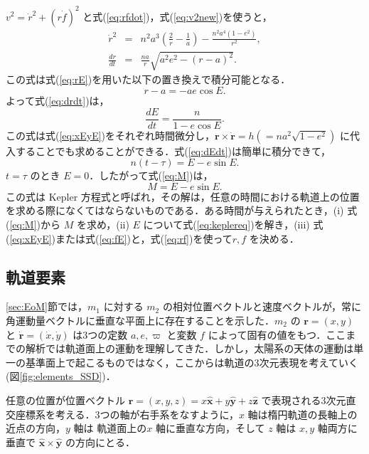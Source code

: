 \documentclass[11pt,a4paper,oneside,onecolumn]{jreport}
\begin{document}
$v^2 = \dot{r}^2 + (r \dot{f})^2$ と式(\ref{eq:rfdot})，式(\ref{eq:v2new})を使うと，
\begin{eqnarray}
\dot{r}^2 & = & n^2 a^3 \left( \frac{2}{r} - \frac{1}{a} \right) - \frac{n^2 a^4 (1 - e^2)}{r^2}, \\
\frac{dr}{dt} & = & \frac{na}{r} \sqrt{a^2 e^2 - (r - a)^2}. \label{eq:drdt}
\end{eqnarray}
この式は式(\ref{eq:rE})を用いた以下の置き換えで積分可能となる．
\begin{equation}
r - a = - a e \cos E.
\end{equation}
よって式(\ref{eq:drdt})は，
\begin{equation}
\frac{dE}{dt} = \frac{n}{1 - e \cos E}. \label{eq:dEdt}
\end{equation}
この式は式(\ref{eq:xEyE})をそれぞれ時間微分し，${\bm r} \times \dot{{\bm r}} = h ( = n a^2 \sqrt{1 - e^2} )$ に代入することでも求めることができる．式(\ref{eq:dEdt})は簡単に積分できて，
\begin{equation}
n (t - \tau) = E - e \sin E. \label{eq:tauE}
\end{equation}
$t = \tau$ のとき $E = 0$．したがって式(\ref{eq:M})は，
\begin{equation}
M = E - e \sin E. \label{eq:keplereq}
\end{equation}
この式は Kepler 方程式と呼ばれ，その解は，任意の時間における軌道上の位置を求める際になくてはならないものである．ある時間が与えられたとき，(i) 式(\ref{eq:M})から $M$ を求め，(ii) $E$ について式(\ref{eq:keplereq})を解き，(iii) 式(\ref{eq:xEyE})または式(\ref{eq:fE})と，式(\ref{eq:rf})を使って$r, f$ を決める．

\subsection{軌道要素 \label{sec:elements}}
\ref{sec:EoM}節では，$m_1$ に対する $m_2$ の相対位置ベクトルと速度ベクトルが，常に角運動量ベクトルに垂直な平面上に存在することを示した．$m_2$ の ${\bm r} = (x, y)$ と $\dot{\bm r} = (\dot{x}, \dot{y})$ は3つの定数 $a, e, \varpi$ と変数 $f$ によって固有の値をもつ．ここまでの解析では軌道面上の運動を理解してきた．しかし，太陽系の天体の運動は単一の基準面上で起こるものではなく，ここからは軌道の3次元表現を考えていく (図\ref{fig:elements_SSD})．
 
任意の位置が位置ベクトル ${\bm r} = (x, y, z) = x \hat{\bm x} + y \hat{\bm y} + z \hat{\bm z}$ で表現される3次元直交座標系を考える．3つの軸が右手系をなすように，$x$ 軸は楕円軌道の長軸上の近点の方向，$y$ 軸は 軌道面上の$x$ 軸に垂直な方向，そして $z$ 軸は $x, y$ 軸両方に垂直で $\hat{\bm x} \times \hat{\bm y}$ の方向にとる．
\end{document}

